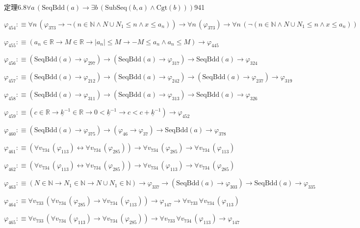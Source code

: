 \begin{fullproof}{定理6.8}{$\forall a\,(\mathrm{SeqBdd}(a) \to \exists b\,(\mathrm{SubSeq}(b,a) \land \mathrm{Cgt}(b)))$}{941}
\begin{abbrevlist}
\item $\varphi_{454} :\equiv \forall n\,(\varphi_{373} \to \neg (n \in \mathbb{N} \land N \cup N_{1} \leq n \land x \leq a_{n})) \to \forall n\,(\varphi_{373}) \to \forall n\,(\neg (n \in \mathbb{N} \land N \cup N_{1} \leq n \land x \leq a_{n}))$
\item $\varphi_{455} :\equiv (a_{n} \in \mathbb{R} \to M \in \mathbb{R} \to \lvert a_{n} \rvert \leq M \to -M \leq a_{n} \land a_{n} \leq M) \to \varphi_{445}$
\item $\varphi_{456} :\equiv (\mathrm{SeqBdd}(a) \to \varphi_{297}) \to (\mathrm{SeqBdd}(a) \to \varphi_{317}) \to \mathrm{SeqBdd}(a) \to \varphi_{324}$
\item $\varphi_{457} :\equiv (\mathrm{SeqBdd}(a) \to \varphi_{212}) \to (\mathrm{SeqBdd}(a) \to \varphi_{242}) \to (\mathrm{SeqBdd}(a) \to \varphi_{237}) \to \varphi_{319}$
\item $\varphi_{458} :\equiv (\mathrm{SeqBdd}(a) \to \varphi_{311}) \to (\mathrm{SeqBdd}(a) \to \varphi_{313}) \to \mathrm{SeqBdd}(a) \to \varphi_{326}$
\item $\varphi_{459} :\equiv (c \in \mathbb{R} \to \underline{k}^{-1} \in \mathbb{R} \to 0 < \underline{k}^{-1} \to c < c + \underline{k}^{-1}) \to \varphi_{452}$
\item $\varphi_{460} :\equiv (\mathrm{SeqBdd}(a) \to \varphi_{375}) \to (\varphi_{46} \to \varphi_{37}) \to \mathrm{SeqBdd}(a) \to \varphi_{378}$
\item $\varphi_{461} :\equiv (\forall v_{734}\,(\varphi_{113}) \leftrightarrow \forall v_{734}\,(\varphi_{285})) \to \forall v_{734}\,(\varphi_{285}) \to \forall v_{734}\,(\varphi_{113})$
\item $\varphi_{462} :\equiv (\forall v_{734}\,(\varphi_{113}) \leftrightarrow \forall v_{734}\,(\varphi_{285})) \to \forall v_{734}\,(\varphi_{113}) \to \forall v_{734}\,(\varphi_{285})$
\item $\varphi_{463} :\equiv (N \in \mathbb{N} \to N_{1} \in \mathbb{N} \to N \cup N_{1} \in \mathbb{N}) \to \varphi_{337} \to (\mathrm{SeqBdd}(a) \to \varphi_{303}) \to \mathrm{SeqBdd}(a) \to \varphi_{335}$
\item $\varphi_{464} :\equiv \forall v_{733}\,(\forall v_{734}\,(\varphi_{285}) \to \forall v_{734}\,(\varphi_{113})) \to \varphi_{147} \to \forall v_{733}\,\forall v_{734}\,(\varphi_{113})$
\item $\varphi_{465} :\equiv \forall v_{733}\,(\forall v_{734}\,(\varphi_{113}) \to \forall v_{734}\,(\varphi_{285})) \to \forall v_{733}\,\forall v_{734}\,(\varphi_{113}) \to \varphi_{147}$

\end{abbrevlist}
\end{fullproof}
